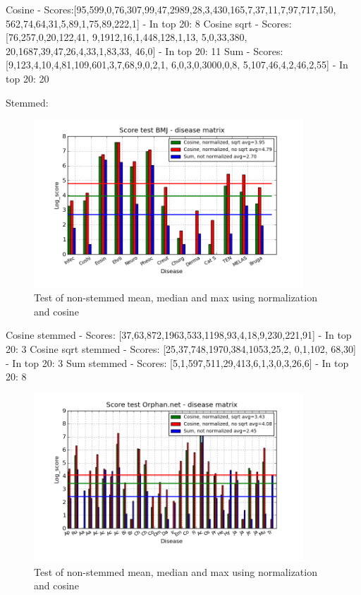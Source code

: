 Cosine - Scores:[95,599,0,76,307,99,47,2989,28,3,430,165,7,37,11,7,97,717,150, 562,74,64,31,5,89,1,75,89,222,1] - In top 20: 8
Cosine sqrt - Scores: [76,257,0,20,122,41, 9,1912,16,1,448,128,1,13, 5,0,33,380, 20,1687,39,47,26,4,33,1,83,33, 46,0] - In top 20: 11
Sum - Scores: [9,123,4,10,4,81,109,601,3,7,68,9,0,2,1, 6,0,3,0,3000,0,8, 5,107,46,4,2,46,2,55] - In top 20: 20

Stemmed:

\begin{figure}[h!]
        \begin{center}
          \includegraphics[width=0.9\textwidth]{barcharts/diseaseMatrix_bmj_hist_norm_3000_s_cos_sqrt_cos_sum_nn.png}
        \end{center}
        \caption{Test of non-stemmed mean, median and max using normalization and cosine}
        \label{diseaseMatrix_bmj_hist_norm_3000_s_cos_sqrt_cos_sum_nn}
\end{figure}

 
Cosine stemmed - Scores: [37,63,872,1963,533,1198,93,4,18,9,230,221,91] - In top 20: 3
Cosine sqrt stemmed - Scores: [25,37,748,1970,384,1053,25,2, 0,1,102, 68,30] - In top 20: 3 
Sum stemmed - Scores: [5,1,597,511,29,413,6,1,3,0,3,26,6] - In top 20: 8

\begin{figure}[h!]
        \begin{center}
          \includegraphics[width=0.9\textwidth]{barcharts/diseaseMatrix_orphan_hist_NOTnorm_3000_s_cos_sqrt_cos_sum_nn.png}
        \end{center}
        \caption{Test of non-stemmed mean, median and max using normalization and cosine}
        \label{diseaseMatrix_orphan_hist_NOTnorm_3000_s_cos_sqrt_cos_sum_nn}
\end{figure}

